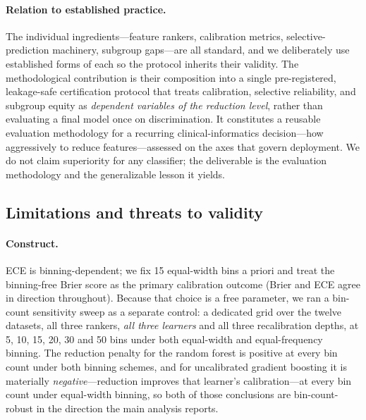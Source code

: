 \documentclass[fleqn,10pt]{wlscirep}
\newcommand{\result}[1]{#1}
\begin{document}
\paragraph{Relation to established practice.} The individual ingredients---feature rankers, calibration
metrics, selective-prediction machinery, subgroup gaps---are all standard, and we deliberately use
established forms of each so the protocol inherits their validity. The methodological contribution is
their composition into a single pre-registered, leakage-safe certification protocol that treats
calibration, selective reliability, and subgroup equity as \emph{dependent variables of the reduction
level}, rather than evaluating a final model once on discrimination. It constitutes a reusable
evaluation methodology for a recurring clinical-informatics decision---how aggressively to reduce
features---assessed on the axes that govern deployment. We do not claim superiority for any
classifier; the deliverable is the evaluation methodology and the generalizable lesson it yields.

\subsection{Limitations and threats to validity}
\label{sec:threats}

\paragraph{Construct.} ECE is binning-dependent; we fix 15 equal-width bins a priori and treat the
binning-free Brier score as the primary calibration outcome (Brier and ECE agree in direction
throughout). Because that choice is a free parameter, we ran a bin-count sensitivity sweep as a
separate control: a dedicated grid over the twelve datasets, all three rankers, \emph{all three
learners} and all three recalibration depths, at \result{5}, \result{10}, \result{15},
\result{20}, \result{30} and \result{50} bins under both equal-width and equal-frequency binning.
The reduction penalty for the random forest is positive at every bin count under both binning
schemes, and for uncalibrated gradient boosting it is materially \emph{negative}---reduction
improves that learner's calibration---at every bin count under equal-width binning, so both of
those conclusions are bin-count-robust in the direction the main analysis reports.
\end{document}
